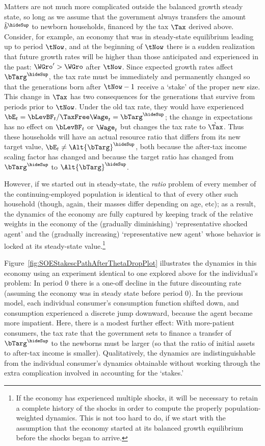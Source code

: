 \documentclass{\handout}
\begin{document}
Matters are not much more complicated outside the balanced growth
steady state, so long as we assume that the government always
transfers the amount $\hat{b}^{\hideSup}$ to newborn households, financed by
the tax $\Tax$ derived above.  Consider, for example, an economy that
was in steady-state equilibrium leading up to period $\tNow$, and at
the beginning of $\tNow$ there is a sudden realization that future
growth rates will be higher than those anticipated and experienced in
the past: $\WGro^{\prime} > \WGro$ after $\tNow$.  Since expected
growth rates affect $\bTarg^{\hideSup}$, the tax rate must be immediately and
permanently changed so that the generations born after $\tNow-1$
receive a `stake' of the proper new size.  This change in $\Tax$ has
two consequences for the generations that survive from periods prior
to $\tNow$.  Under the old tax rate, they would have experienced
$\bE_{t} = \bLevBF_{t}/\TaxFree\Wage_{t} = \bTarg^{\hideSup}$; the change in
expectations has no effect on $\bLevBF_{t}$ or $\Wage_{t}$ but changes
the tax rate to $\grave{\Tax}$.  Thus these households will have an
actual resource ratio that differs from its new target value, $\bE_{t}
\neq \Alt{\bTarg}^{\hideSup}$, both because the after-tax income scaling factor
has changed and because the target ratio has changed from $\bTarg^{\hideSup}$
to $\Alt{\bTarg}^{\hideSup}$.

However, if we started out in steady-state, the {\it ratio} problem of every
member of the continuing-employed population is identical to that of every 
other such household (though, again, their masses differ depending on age, etc); as a result, the dynamics of the economy are fully captured
by keeping track of the relative weights in the economy of the (gradually diminishing) `representative shocked agent' and the (gradually increasing) `representative new agent' 
whose behavior is locked at its steady-state value.\footnote{
If the economy has experienced multiple shocks, it will be necessary to
retain a complete history of the shocks in order to compute the properly 
population-weighted dynamics.  This is not too hard to do, if we start with
the assumption that the economy started at its balanced growth equilibrium before the shocks began to arrive.}

Figure~\ref{fig:SOEStakescPathAfterThetaDropPlot} illustrates the
dynamics in this economy using an experiment identical to one explored
above for the individual's problem: In period 0 there is a one-off
decline in the future discounting rate (assuming the economy was in
steady state before period 0).  In the previous model, each individual
consumer's consumption function shifted down, and consumption
experienced a discrete jump downward, because the agent became more
impatient.  Here, there is a modest further effect: With
more-patient consumers, the tax rate that the government sets to finance a transfer
of $\bTarg^{\hideSup}$ to the newborns must be larger (so that the ratio of initial assets to
after-tax income is smaller).  Qualitatively, the
dynamics are indistinguishable from the individual consumer's dynamics
obtainable without working through the extra complication involved in
accounting for the `stakes.'
\end{document}
